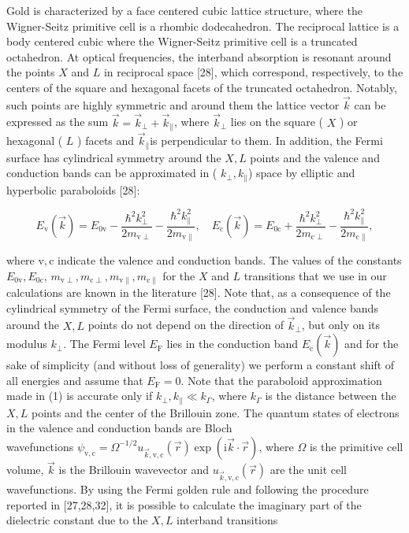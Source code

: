 \documentclass[10pt]{article}
\begin{document}
Gold is characterized by a face centered cubic lattice structure, where the Wigner-Seitz primitive cell is a rhombic dodecahedron. The reciprocal lattice is a body centered cubic where the Wigner-Seitz primitive cell is a truncated octahedron. At optical frequencies, the interband absorption is resonant around the points $X$ and $L$ in reciprocal space [28], which correspond, respectively, to the centers of the square and hexagonal facets of the truncated octahedron. Notably, such points are highly symmetric and around them the lattice vector $\vec{k}$ can be expressed as the sum $\vec{k}=\vec{k}_{\perp}+\vec{k}_{\|}$, where $\vec{k}_{\perp}$ lies on the square ( $X$ ) or hexagonal ( $L$ ) facets and $\vec{k}_{\|}$is perpendicular to them. In addition, the Fermi surface has cylindrical symmetry around the $X, L$ points and the valence and conduction bands can be approximated in ( $k_{\perp}, k_{\|}$) space by elliptic and hyperbolic paraboloids [28]:


\begin{equation*}
E_{\mathrm{v}}(\vec{k})=E_{0 \mathrm{v}}-\frac{\hbar^{2} k_{\perp}^{2}}{2 m_{\mathrm{v} \perp}}-\frac{\hbar^{2} k_{\|}^{2}}{2 m_{\mathrm{v} \|}}, \quad E_{\mathrm{c}}(\vec{k})=E_{0 \mathrm{c}}+\frac{\hbar^{2} k_{\perp}^{2}}{2 m_{\mathrm{c} \perp}}-\frac{\hbar^{2} k_{\|}^{2}}{2 m_{\mathrm{c} \|}}, \tag{1}
\end{equation*}


where $\mathrm{v}, \mathrm{c}$ indicate the valence and conduction bands. The values of the constants $E_{0 \mathrm{v}}, E_{0 \mathrm{c}}$, $m_{\mathrm{v} \perp}, m_{\mathrm{c} \perp}, m_{\mathrm{v} \|}, m_{\mathrm{c} \|}$ for the $X$ and $L$ transitions that we use in our calculations are known in the literature [28]. Note that, as a consequence of the cylindrical symmetry of the Fermi surface, the conduction and valence bands around the $X, L$ points do not depend on the direction of $\vec{k}_{\perp}$, but only on its modulus $k_{\perp}$. The Fermi level $E_{\mathrm{F}}$ lies in the conduction band $E_{\mathrm{c}}(\vec{k})$ and for the sake of simplicity (and without loss of generality) we perform a constant shift of all energies and assume that $E_{\mathrm{F}}=0$. Note that the paraboloid approximation made in (1) is accurate only if $k_{\perp}, k_{\|} \ll k_{\Gamma}$, where $k_{\Gamma}$ is the distance between the $X, L$ points and the center of the Brillouin zone. The quantum states of electrons in the valence and conduction bands are Bloch\\
wavefunctions $\psi_{\mathrm{v}, \mathrm{c}}=\Omega^{-1 / 2} u_{\vec{k}, \mathrm{v}, \mathrm{c}}(\vec{r}) \exp (\mathrm{i} \vec{k} \cdot \vec{r})$, where $\Omega$ is the primitive cell volume, $\vec{k}$ is the Brillouin wavevector and $u_{\vec{k}, \mathrm{v}, \mathrm{c}}(\vec{r})$ are the unit cell wavefunctions. By using the Fermi golden rule and following the procedure reported in [27,28,32], it is possible to calculate the imaginary part of the dielectric constant due to the $X, L$ interband transitions
\end{document}
